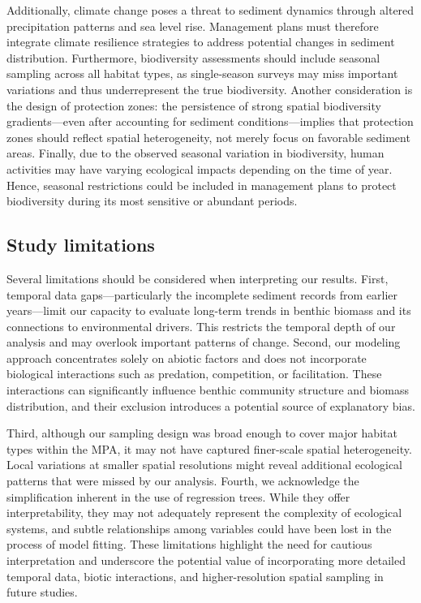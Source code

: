 \documentclass[12pt]{article}
\begin{document}
\qquad Additionally, climate change poses a threat to sediment dynamics through altered precipitation patterns and sea level rise. Management plans must therefore integrate climate resilience strategies to address potential changes in sediment distribution. Furthermore, biodiversity assessments should include seasonal sampling across all habitat types, as single-season surveys may miss important variations and thus underrepresent the true biodiversity. Another consideration is the design of protection zones: the persistence of strong spatial biodiversity gradients—even after accounting for sediment conditions—implies that protection zones should reflect spatial heterogeneity, not merely focus on favorable sediment areas. Finally, due to the observed seasonal variation in biodiversity, human activities may have varying ecological impacts depending on the time of year. Hence, seasonal restrictions could be included in management plans to protect biodiversity during its most sensitive or abundant periods.

\subsection{Study limitations}

\qquad Several limitations should be considered when interpreting our results. First, temporal data gaps—particularly the incomplete sediment records from earlier years—limit our capacity to evaluate long-term trends in benthic biomass and its connections to environmental drivers. This restricts the temporal depth of our analysis and may overlook important patterns of change. Second, our modeling approach concentrates solely on abiotic factors and does not incorporate biological interactions such as predation, competition, or facilitation. These interactions can significantly influence benthic community structure and biomass distribution, and their exclusion introduces a potential source of explanatory bias.

\qquad Third, although our sampling design was broad enough to cover major habitat types within the MPA, it may not have captured finer-scale spatial heterogeneity. Local variations at smaller spatial resolutions might reveal additional ecological patterns that were missed by our analysis. Fourth, we acknowledge the simplification inherent in the use of regression trees. While they offer interpretability, they may not adequately represent the complexity of ecological systems, and subtle relationships among variables could have been lost in the process of model fitting. These limitations highlight the need for cautious interpretation and underscore the potential value of incorporating more detailed temporal data, biotic interactions, and higher-resolution spatial sampling in future studies.
\end{document}
